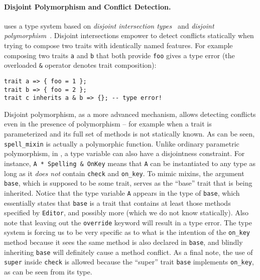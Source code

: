 \paragraph{Disjoint Polymorphism and Conflict Detection.}

\name uses a type system based on \emph{disjoint intersection types}~\cite{oliveira2016disjoint} and
\emph{disjoint polymorphism}~\cite{alpuimdisjoint}. Disjoint intersections
empower \name to detect conflicts statically when trying to compose two
traits with identically named features. For example composing two traits
\lstinline{a} and \lstinline{b} that both provide \lstinline{foo} gives a
type error (the overloaded \lstinline{&} operator denotes trait composition):
\begin{lstlisting}
trait a => { foo = 1 };
trait b => { foo = 2 };
trait c inherits a & b => {}; -- type error!
\end{lstlisting}
Disjoint polymorphism, as a more advanced mechanism, allows detecting conflicts
even in the presence of polymorphism -- for example when a trait is parameterized and its
full set of methods is not statically known. As can be seen,
\lstinline{spell_mixin} is actually a polymorphic function. Unlike ordinary
parametric polymorphism, in \name, a type variable can also have a disjointness
constraint. For instance, \lstinline{A * Spelling & OnKey}
means that \lstinline{A} can be instantiated to any type as long as it \emph{does not}
contain \lstinline{check} and \lstinline{on_key}. To mimic mixins, the
argument \lstinline{base}, which is supposed to be some trait, serves as the
``base'' trait that is being inherited. Notice that the type variable
\lstinline{A} appears in the type of \lstinline{base}, which essentially states
that \lstinline{base} is a trait that contains at least those methods specified
by \lstinline{Editor}, and possibly more (which we do not know statically).
Also note that leaving out the \lstinline{override} keyword will result in a
type error. The type system is forcing us to be very specific as to what is the
intention of the \lstinline{on_key} method because it sees the same method is
also declared in \lstinline{base}, and blindly inheriting \lstinline{base}
will definitely cause a method conflict. As a final note, the use of \lstinline{super}
inside \lstinline{check} is allowed because the ``super'' trait \lstinline{base}
implements \lstinline{on_key}, as can be seen from its type.


